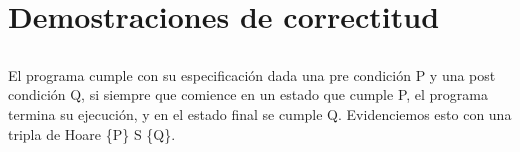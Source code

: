\documentclass[10pt,a4paper]{article}
\begin{document}
	
	
	
	\setcounter{section}{1}
	
	\section{Demostraciones de correctitud}
	
	
	
	
	
		
		
		
	
	\subsection{}
	\noindent 
	El programa cumple con su especificación dada una pre condición P y una post condición Q, si
	siempre que comience en un estado que cumple P, el programa termina su ejecución, y en el estado 
	final se cumple Q. Evidenciemos esto con una tripla de Hoare \{P\} S \{Q\}.
	
	\vspace{0.3 cm}
	
\end{document}

